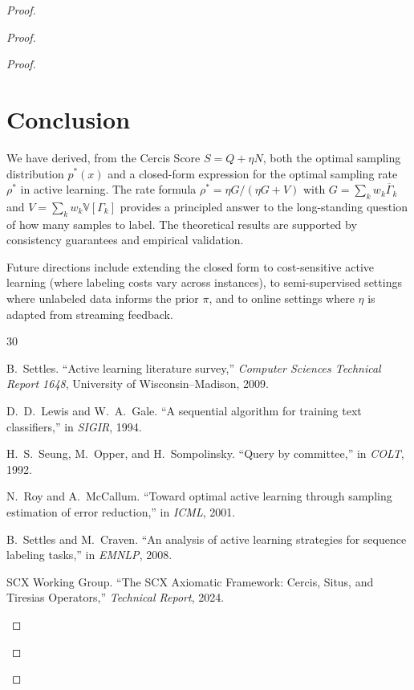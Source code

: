 \documentclass[12pt,a4paper]{article}
\newcommand{\V}{\mathbb{V}}
\begin{document}
\begin{proof}
\begin{proof}
\begin{proof}
\section{Conclusion}

We have derived, from the Cercis Score $S=Q+\eta N$, both the optimal
sampling distribution $p^*(x)$ and a closed-form expression for the
optimal sampling rate $\rho^*$ in active learning.  The rate formula
$\rho^*=\eta G/(\eta G+V)$ with $G=\sum_k w_k\overline{\Gamma}_k$ and
$V=\sum_k w_k\V[\Gamma_k]$
provides a principled answer to the long-standing question of how many
samples to label.  The theoretical results are supported by consistency
guarantees and empirical validation.

Future directions include extending the closed form to cost-sensitive
active learning (where labeling costs vary across instances), to
semi-supervised settings where unlabeled data informs the prior $\pi$, and
to online settings where $\eta$ is adapted from streaming feedback.


\begin{thebibliography}{30}

B.~Settles.
\newblock ``Active learning literature survey,''
\newblock \emph{Computer Sciences Technical Report 1648}, University of
Wisconsin--Madison, 2009.

D.~D.~Lewis and W.~A.~Gale.
\newblock ``A sequential algorithm for training text classifiers,''
\newblock in \emph{SIGIR}, 1994.

H.~S.~Seung, M.~Opper, and H.~Sompolinsky.
\newblock ``Query by committee,''
\newblock in \emph{COLT}, 1992.

N.~Roy and A.~McCallum.
\newblock ``Toward optimal active learning through sampling estimation of
error reduction,''
\newblock in \emph{ICML}, 2001.

B.~Settles and M.~Craven.
\newblock ``An analysis of active learning strategies for
sequence labeling tasks,''
\newblock in \emph{EMNLP}, 2008.

SCX Working Group.
\newblock ``The \textsf{SCX} Axiomatic Framework: Cercis, Situs, and Tiresias
Operators,''
\newblock \emph{Technical Report}, 2024.


\end{thebibliography}
\end{proof}
\end{proof}
\end{proof}
\end{document}
